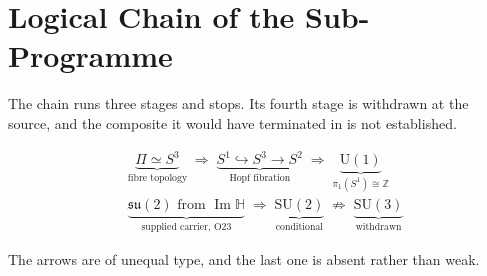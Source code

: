 \documentclass[11pt,a4paper]{article}
\theoremstyle{definition}
\newcommand{\SU}{\mathrm{SU}}
\newcommand{\su}{\mathfrak{su}}
\newcommand{\UU}{\mathrm{U}}
\newcommand{\ImH}{\operatorname{Im}\mathbb{H}}
\begin{document}
  \section{Logical Chain of the Sub-Programme}
    \label{sec:chain}

    The chain runs three stages and stops.
    Its fourth stage is withdrawn at the source, and the composite it would have terminated in is
    not established.

    \begin{equation}
      \label{eq:chain}
      \begin{aligned}
        &\underbrace{\Pi \simeq S^3}_{\text{fibre topology}}
        \;\Longrightarrow\;
        \underbrace{S^1 \hookrightarrow S^3 \to S^2}_{\text{Hopf fibration}}
        \;\Longrightarrow\;
        \underbrace{\UU(1)}_{\pi_1(S^1) \cong \mathbb{Z}} \\[1.2em]
        &\underbrace{\su(2) \text{ from } \ImH}_{\text{supplied carrier, O23}}
        \;\Longrightarrow\;
        \underbrace{\SU(2)}_{\text{conditional}}
        \;\not\Longrightarrow\;
        \underbrace{\SU(3)}_{\text{withdrawn}}
      \end{aligned}
    \end{equation}

    The arrows are of unequal type, and the last one is absent rather than weak.
\end{document}
